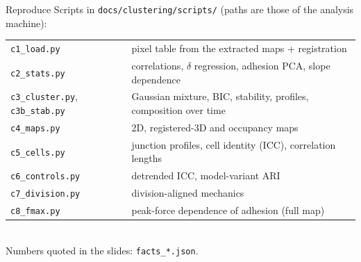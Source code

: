 \documentclass[aspectratio=169,9pt]{beamer}
\begin{document}
\begin{frame}[fragile]{Reproduce}
\footnotesize
Scripts in \texttt{docs/clustering/scripts/} (paths are those of the analysis machine):
\begin{tabularx}{\linewidth}{@{}lX@{}}\toprule
\texttt{c1\_load.py} & pixel table from the extracted maps + registration \\
\texttt{c2\_stats.py} & correlations, $\delta$ regression, adhesion PCA, slope dependence \\
\texttt{c3\_cluster.py}, \texttt{c3b\_stab.py} & Gaussian mixture, BIC, stability, profiles, composition over time \\
\texttt{c4\_maps.py} & 2D, registered-3D and occupancy maps \\
\texttt{c5\_cells.py} & junction profiles, cell identity (ICC), correlation lengths \\
\texttt{c6\_controls.py} & detrended ICC, model-variant ARI \\
\texttt{c7\_division.py} & division-aligned mechanics \\
\texttt{c8\_fmax.py} & peak-force dependence of adhesion (full map) \\
\bottomrule\end{tabularx}\\[4pt]
Numbers quoted in the slides: \texttt{facts\_*.json}.
\end{frame}
\end{document}
